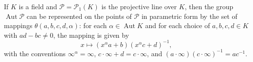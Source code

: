 If $K$ is a field and $\mathcal{P} = \mathcal{P}_1(K)$ is the projective line over $K$, then the group $\operatorname{Aut} \mathcal{P}$ can be represented on the points of $\mathcal{P}$ in parametric form by the set of mappings $\theta(a, b, c, d, \alpha)$: for each $\alpha \in \operatorname{Aut} K$ and for each choice of $a, b, c, d \in K$ with $ad - bc \neq 0$, the mapping is given by
$$x \mapsto (x^\alpha a + b)(x^\alpha c + d)^{-1},$$
with the conventions $\infty^\alpha = \infty$, $c \cdot \infty + d = c \cdot \infty$, and $(a \cdot \infty)(c \cdot \infty)^{-1} = ac^{-1}$.
